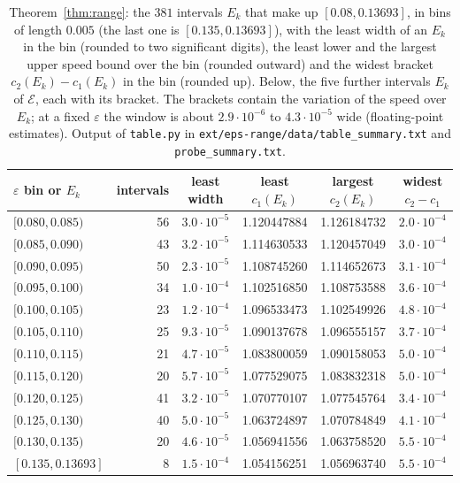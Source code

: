 \documentclass[11pt]{article}
\theoremstyle{definition}
\newcommand{\eps}{\varepsilon}
\begin{document}
\begin{table}[t]
\centering\small
\caption{Theorem~\ref{thm:range}: the $381$ intervals $E_k$ that make up $[0.08, 0.13693]$, in bins of length $0.005$ (the last one is $[0.135, 0.13693]$), with the least width of an $E_k$ in the bin (rounded to two significant digits), the least lower and the largest upper speed bound over the bin (rounded outward) and the widest bracket $c_2(E_k) - c_1(E_k)$ in the bin (rounded up). Below, the five further intervals $E_k$ of $\mathcal{E}$, each with its bracket. The brackets contain the variation of the speed over $E_k$; at a fixed $\eps$ the window is about $2.9\cdot 10^{-6}$ to $4.3\cdot 10^{-5}$ wide (floating-point estimates). Output of \texttt{table.py} in \texttt{ext/eps-range/data/table\_summary.txt} and \texttt{probe\_summary.txt}.}\label{tab:range}
\begin{tabular}{lrcccc}
\toprule
$\eps$ bin or $E_k$ & intervals & least width & least $c_1(E_k)$ & largest $c_2(E_k)$ & widest $c_2 - c_1$ \\
\midrule
$[0.080, 0.085)$ & 56 & $3.0\cdot 10^{-5}$ & 1.120447884 & 1.126184732 & $2.0\cdot 10^{-4}$ \\
$[0.085, 0.090)$ & 43 & $3.2\cdot 10^{-5}$ & 1.114630533 & 1.120457049 & $3.0\cdot 10^{-4}$ \\
$[0.090, 0.095)$ & 50 & $2.3\cdot 10^{-5}$ & 1.108745260 & 1.114652673 & $3.1\cdot 10^{-4}$ \\
$[0.095, 0.100)$ & 34 & $1.0\cdot 10^{-4}$ & 1.102516850 & 1.108753588 & $3.6\cdot 10^{-4}$ \\
$[0.100, 0.105)$ & 23 & $1.2\cdot 10^{-4}$ & 1.096533473 & 1.102549926 & $4.8\cdot 10^{-4}$ \\
$[0.105, 0.110)$ & 25 & $9.3\cdot 10^{-5}$ & 1.090137678 & 1.096555157 & $3.7\cdot 10^{-4}$ \\
$[0.110, 0.115)$ & 21 & $4.7\cdot 10^{-5}$ & 1.083800059 & 1.090158053 & $5.0\cdot 10^{-4}$ \\
$[0.115, 0.120)$ & 20 & $5.7\cdot 10^{-5}$ & 1.077529075 & 1.083832318 & $5.0\cdot 10^{-4}$ \\
$[0.120, 0.125)$ & 41 & $3.2\cdot 10^{-5}$ & 1.070770107 & 1.077545764 & $3.4\cdot 10^{-4}$ \\
$[0.125, 0.130)$ & 40 & $5.0\cdot 10^{-5}$ & 1.063724897 & 1.070784849 & $4.1\cdot 10^{-4}$ \\
$[0.130, 0.135)$ & 20 & $4.6\cdot 10^{-5}$ & 1.056941556 & 1.063758520 & $5.5\cdot 10^{-4}$ \\
$[0.135, 0.13693]$ & 8 & $1.5\cdot 10^{-4}$ & 1.054156251 & 1.056963740 & $5.5\cdot 10^{-4}$ \\

\end{tabular}
\end{table}
\end{document}
